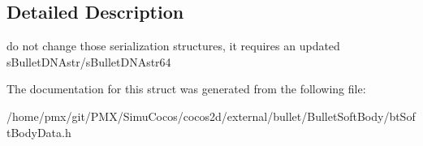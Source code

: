 \subsection{Detailed Description}
do not change those serialization structures, it requires an updated s\+Bullet\+D\+N\+Astr/s\+Bullet\+D\+N\+Astr64 

The documentation for this struct was generated from the following file\+:\begin{DoxyCompactItemize}
\item 
/home/pmx/git/\+P\+M\+X/\+Simu\+Cocos/cocos2d/external/bullet/\+Bullet\+Soft\+Body/bt\+Soft\+Body\+Data.\+h\end{DoxyCompactItemize}
